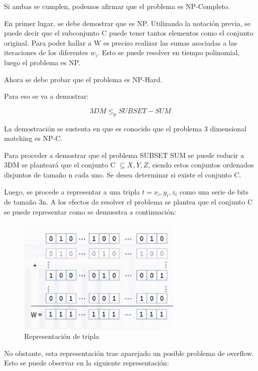 Si ambas se cumplen, podemos afirmar que el problema es NP-Completo.

En primer lugar, se debe demostrar que es NP. Utilizando la notación previa, se puede decir que el subconjunto C puede tener tantos elementos como el conjunto original. Para poder hallar a W es preciso realizar las sumas asociadas a las iteraciones de los diferentes $w_{i}$. Esto se puede resolver en tiempo polinomial, luego el problema es NP.

Ahora se debe probar que el problema es NP-Hard. 

Para eso se va a demostrar:

\begin{equation}
    3DM \leq_{p} SUBSET-SUM
\end{equation}

La demostración se sustenta en que es conocido que el problema 3 dimensional matching es NP-C.

Para proceder a demostrar que el problema SUBSET SUM se puede reducir a 3DM se planteará que el conjunto C $\subseteq X,Y,Z$, siendo estos conjuntos ordenados disjuntos de tamaño n cada uno. Se desea determinar si existe el conjunto C.

Luego, se procede a representar a una tripla $t={x_{i}, y_{i}, z_{i}}$ como una serie de bits de tamaño 3n. A los efectos de resolver el problema se plantea que el conjunto C se puede representar como se demuestra a continuación:

\begin{figure}[H]
\centering
\includegraphics[width=0.7\textwidth]{Informe/Imagenes/Parte2/imagen1.png}
\caption{\label{fig:class01}Representación de tripla}
\end{figure}

No obstante, esta representación trae aparejado un posible problema de overflow. Esto se puede observar en la siguiente representación:

